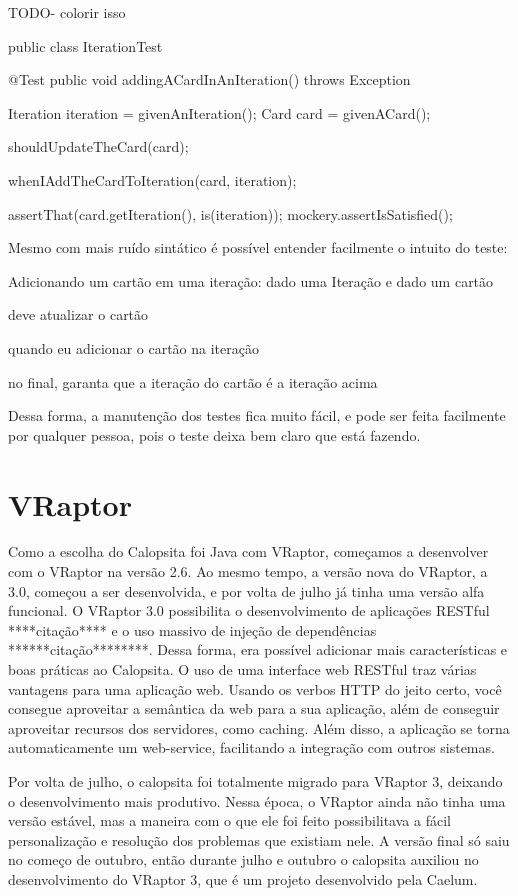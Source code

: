 TODO- colorir isso

public class IterationTest {
	@Test
	public void addingACardInAnIteration() throws Exception {
		Iteration iteration = givenAnIteration();
		Card card = givenACard();

		shouldUpdateTheCard(card);

		whenIAddTheCardToIteration(card, iteration);

		assertThat(card.getIteration(), is(iteration));
		mockery.assertIsSatisfied();
	}
}

Mesmo com mais ruído sintático é possível entender facilmente o intuito do teste:

Adicionando um cartão em uma iteração:
  dado uma Iteração e
  dado um cartão
  
  deve atualizar o cartão
  
  quando eu adicionar o cartão na iteração
  
  no final, garanta que a iteração do cartão é a iteração acima
  

Dessa forma, a manutenção dos testes fica muito fácil, e pode ser feita facilmente por qualquer pessoa, pois o teste deixa bem claro que está fazendo.


\section{VRaptor}

Como a escolha do Calopsita foi Java com VRaptor, começamos a desenvolver com o VRaptor na versão 2.6. 
Ao mesmo tempo, a versão nova do VRaptor, a 3.0, começou a ser desenvolvida, e por volta de julho já tinha 
uma versão alfa funcional. O VRaptor 3.0 possibilita o desenvolvimento de aplicações RESTful ****citação**** 
e o uso massivo de injeção de dependências ******citação********. Dessa forma, era possível adicionar mais 
características e boas práticas ao Calopsita. O uso de uma interface web RESTful traz várias vantagens para 
uma aplicação web. Usando os verbos HTTP do jeito certo, você consegue aproveitar a semântica da web para a 
sua aplicação, além de conseguir aproveitar recursos dos servidores, como caching. Além disso, a aplicação 
se torna automaticamente um web-service, facilitando a integração com outros sistemas.

Por volta de julho, o calopsita foi totalmente migrado para VRaptor 3, deixando o desenvolvimento mais produtivo. 
Nessa época, o VRaptor ainda não tinha uma versão estável, mas a maneira com o que ele foi feito possibilitava a fácil
personalização e resolução dos problemas que existiam nele. A versão final só saiu no começo de outubro, então durante 
julho e outubro o calopsita auxiliou no desenvolvimento do VRaptor 3, que é um projeto \opensource desenvolvido pela Caelum.

